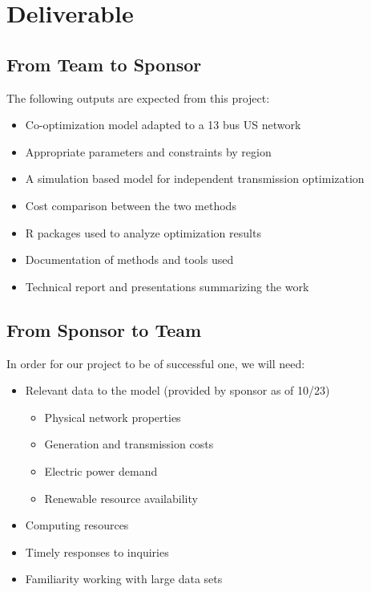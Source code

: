 \documentclass[12pt,letterpaper]{article}
\theoremstyle{definition}
\begin{document}
\newpage

\section{Deliverable}
\subsection{From Team to Sponsor} %
The following outputs are expected from this project:
\begin{itemize}
    \item Co-optimization model adapted to a 13 bus US network
    \item Appropriate parameters and constraints by region
    \item A simulation based model for independent transmission optimization
    \item Cost comparison between the two methods
	\item R packages used to analyze optimization results
	\item Documentation of methods and tools used
    \item Technical report and presentations summarizing the work 
\end{itemize}

\subsection{From Sponsor to Team} %

In order for our project to be of successful one, we will need:
\begin{itemize}
    \item Relevant data to the model (provided by sponsor as of 10/23)
	\begin{itemize}
		\item Physical network properties
		\item Generation and transmission costs
		\item Electric power demand
		\item Renewable resource availability
	\end{itemize}
    \item Computing resources
    \item Timely responses to inquiries
    \item Familiarity working with large data sets
\end{itemize}


\newpage

\renewcommand\bibname{Selected Bibliography Including Cited Works}
\nocite{*}

\end{document}
